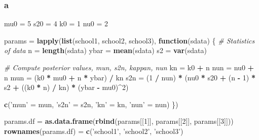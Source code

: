 \documentclass[]{article}
\newenvironment{Shaded}{\begin{snugshade}}{\end{snugshade}}
\newcommand{\CommentTok}[1]{\textcolor[rgb]{0.56,0.35,0.01}{\textit{#1}}}
\newcommand{\ControlFlowTok}[1]{\textcolor[rgb]{0.13,0.29,0.53}{\textbf{#1}}}
\newcommand{\DecValTok}[1]{\textcolor[rgb]{0.00,0.00,0.81}{#1}}
\newcommand{\KeywordTok}[1]{\textcolor[rgb]{0.13,0.29,0.53}{\textbf{#1}}}
\newcommand{\NormalTok}[1]{#1}
\newcommand{\OperatorTok}[1]{\textcolor[rgb]{0.81,0.36,0.00}{\textbf{#1}}}
\newcommand{\StringTok}[1]{\textcolor[rgb]{0.31,0.60,0.02}{#1}}
\begin{document}
\hypertarget{a}{%
\subsubsection{a}\label{a}}

\begin{Shaded}
\begin{Highlighting}[]
\NormalTok{mu0 =}\StringTok{ }\DecValTok{5}
\NormalTok{s20 =}\StringTok{ }\DecValTok{4}
\NormalTok{k0 =}\StringTok{ }\DecValTok{1}
\NormalTok{nu0 =}\StringTok{ }\DecValTok{2}

\NormalTok{params =}\StringTok{ }\KeywordTok{lapply}\NormalTok{(}\KeywordTok{list}\NormalTok{(school1, school2, school3), }\ControlFlowTok{function}\NormalTok{(sdata) \{}
  \CommentTok{# Statistics of data}
\NormalTok{  n =}\StringTok{ }\KeywordTok{length}\NormalTok{(sdata)}
\NormalTok{  ybar =}\StringTok{ }\KeywordTok{mean}\NormalTok{(sdata)}
\NormalTok{  s2 =}\StringTok{ }\KeywordTok{var}\NormalTok{(sdata)}
  
  \CommentTok{# Compute posterior values, mun, s2n, kappan, nun}
\NormalTok{  kn =}\StringTok{ }\NormalTok{k0 }\OperatorTok{+}\StringTok{ }\NormalTok{n}
\NormalTok{  nun =}\StringTok{ }\NormalTok{nu0 }\OperatorTok{+}\StringTok{ }\NormalTok{n}
\NormalTok{  mun =}\StringTok{ }\NormalTok{(k0 }\OperatorTok{*}\StringTok{ }\NormalTok{mu0 }\OperatorTok{+}\StringTok{ }\NormalTok{n }\OperatorTok{*}\StringTok{ }\NormalTok{ybar) }\OperatorTok{/}\StringTok{ }\NormalTok{kn}
\NormalTok{  s2n =}\StringTok{ }\NormalTok{(}\DecValTok{1} \OperatorTok{/}\StringTok{ }\NormalTok{nun) }\OperatorTok{*}\StringTok{ }\NormalTok{(nu0 }\OperatorTok{*}\StringTok{ }\NormalTok{s20 }\OperatorTok{+}\StringTok{ }\NormalTok{(n }\OperatorTok{-}\StringTok{ }\DecValTok{1}\NormalTok{) }\OperatorTok{*}\StringTok{ }\NormalTok{s2 }\OperatorTok{+}\StringTok{ }\NormalTok{((k0 }\OperatorTok{*}\StringTok{ }\NormalTok{n) }\OperatorTok{/}\StringTok{ }\NormalTok{kn) }\OperatorTok{*}\StringTok{ }\NormalTok{(ybar }\OperatorTok{-}\StringTok{ }\NormalTok{mu0)}\OperatorTok{^}\DecValTok{2}\NormalTok{)}
  
  \KeywordTok{c}\NormalTok{(}\StringTok{'mun'}\NormalTok{ =}\StringTok{ }\NormalTok{mun, }\StringTok{'s2n'}\NormalTok{ =}\StringTok{ }\NormalTok{s2n, }\StringTok{'kn'}\NormalTok{ =}\StringTok{ }\NormalTok{kn, }\StringTok{'nun'}\NormalTok{ =}\StringTok{ }\NormalTok{nun)}
\NormalTok{\})}

\NormalTok{params.df =}\StringTok{ }\KeywordTok{as.data.frame}\NormalTok{(}\KeywordTok{rbind}\NormalTok{(params[[}\DecValTok{1}\NormalTok{]], params[[}\DecValTok{2}\NormalTok{]], params[[}\DecValTok{3}\NormalTok{]]))}
\KeywordTok{rownames}\NormalTok{(params.df) =}\StringTok{ }\KeywordTok{c}\NormalTok{(}\StringTok{'school1'}\NormalTok{, }\StringTok{'school2'}\NormalTok{, }\StringTok{'school3'}\NormalTok{)}
\end{Highlighting}
\end{Shaded}
\end{document}
